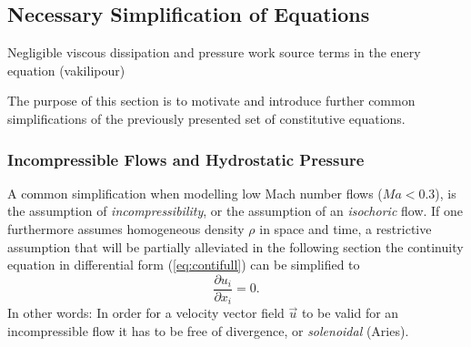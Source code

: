 
    \subsection{Necessary Simplification of Equations}
        Negligible viscous dissipation and pressure work source terms in the enery equation (vakilipour)

        The purpose of this section is to motivate and introduce further common simplifications of the previously presented set of constitutive equations. 

      \subsubsection{Incompressible Flows and Hydrostatic Pressure}

      A common simplification when modelling low Mach number flows (\(Ma < 0.3\)), is the assumption of \emph{incompressibility}, or the assumption of an \emph{isochoric} flow. If one furthermore assumes homogeneous density \(\rho\) in space and time, a restrictive assumption that will be partially alleviated in the following section the continuity equation in differential form (\ref{eq:contifull}) can be simplified to
      \begin{equation}
        \label{eq:contiinc}
        \frac{\partial u_i}{\partial x_i} = 0.
      \end{equation}
      In other words: In order for a velocity vector field \(\vec{u}\) to be valid for an incompressible flow it has to be free of divergence, or \emph{solenoidal} (Aries).

